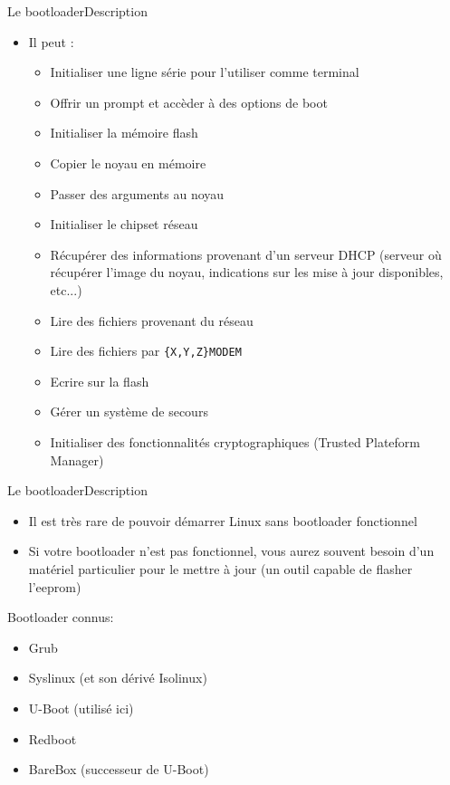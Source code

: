 \begin{frame}[fragile=singleslide]{Le bootloader}{Description}
  \begin{itemize}
  \item Il peut :
    \begin{itemize}
    \item Initialiser une ligne série pour l'utiliser comme terminal
    \item Offrir un prompt et accèder à des options de boot
    \item Initialiser la mémoire flash
    \item Copier le noyau en mémoire
    \item Passer des arguments au noyau
    \item Initialiser le chipset réseau
    \item  Récupérer  des  informations  provenant d'un  serveur  DHCP
      (serveur où récupérer l'image du noyau, indications sur les mise
      à jour disponibles, etc...)
    \item Lire des fichiers provenant du réseau
    \item Lire des fichiers par \verb+{X,Y,Z}MODEM+
    \item Ecrire sur la flash
    \item Gérer un système de secours
    \item  Initialiser des  fonctionnalités  cryptographiques (Trusted
      Plateform Manager)
    \end{itemize}
  \end{itemize}
\end{frame}

\begin{frame}{Le bootloader}{Description}
  \begin{itemize}
    \item Il  est très  rare de pouvoir  démarrer Linux  sans bootloader
    fonctionnel
    \item Si votre bootloader  n'est pas fonctionnel, vous aurez souvent
    besoin d'un matériel particulier pour  le mettre à jour (un outil
    capable de flasher l'eeprom)
  \end{itemize}
  Bootloader connus:
  \begin{itemize}
    \item Grub
    \item Syslinux (et son dérivé Isolinux)
    \item U-Boot (utilisé ici)
    \item Redboot
    \item BareBox (successeur de U-Boot)
  \end{itemize}
\end{frame}

